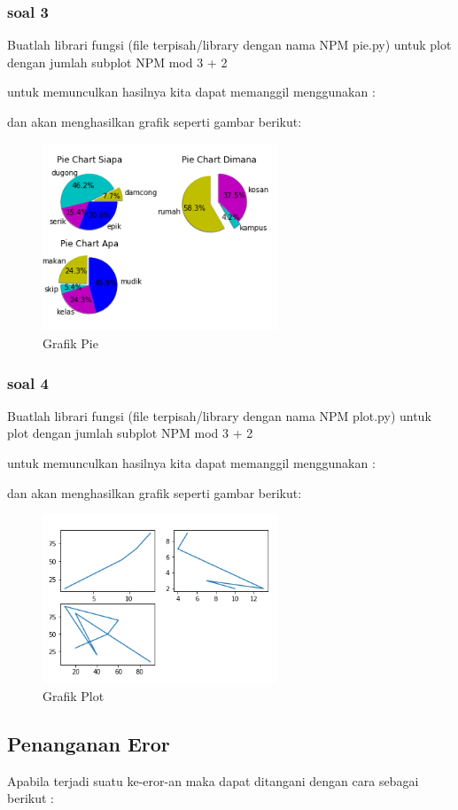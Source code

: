 \subsubsection{soal 3}
Buatlah librari fungsi (ﬁle terpisah/library dengan nama NPM pie.py) untuk plot dengan jumlah subplot NPM mod 3 + 2

untuk memunculkan hasilnya kita dapat memanggil menggunakan :


dan akan menghasilkan grafik seperti gambar berikut:
\begin{figure}[H]
\centering
\includegraphics[width=7cm]{figures/6/1174009/p3.png}
\caption{Grafik Pie}
\label{dwiyul}
\end{figure}


\subsubsection{soal 4}
Buatlah librari fungsi (ﬁle terpisah/library dengan nama NPM plot.py) untuk plot dengan jumlah subplot NPM mod 3 + 2

untuk memunculkan hasilnya kita dapat memanggil menggunakan :


dan akan menghasilkan grafik seperti gambar berikut:
\begin{figure}[H]
\centering
\includegraphics[width=7cm]{figures/6/1174009/p4.png}
\caption{Grafik Plot}
\label{dwiyul}
\end{figure}

\subsection{Penanganan Eror}
Apabila terjadi suatu ke-eror-an maka dapat ditangani dengan cara sebagai berikut :





